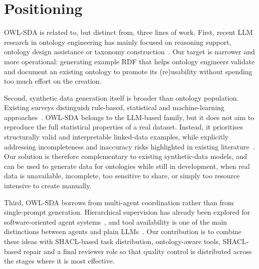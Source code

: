 \section{Positioning} \label{sec:related}
OWL-SDA is related to, but distinct from, three lines of work. First, recent LLM research in ontology engineering has mainly focused on reasoning support, ontology design assistance or taxonomy construction~\cite{damiano2025evaluating,yang2026large,soares2025exploring}. Our target is narrower and more operational: generating example RDF that helps ontology engineers validate and document an existing ontology to promote its (re)usability without spending too much effort on the creation.

Second, synthetic data generation itself is broader than ontology population. Existing surveys distinguish rule-based, statistical and machine-learning approaches~\cite{electronics13173509}. OWL-SDA belongs to the LLM-based family, but it does not aim to reproduce the full statistical properties of a real dataset. Instead, it prioritises structurally valid and interpretable linked-data examples, while explicitly addressing incompleteness and inaccuracy risks highlighted in existing literature~\cite{hao2024synthetic}. Our solution is therefore complementary to existing synthetic-data models, and can be used to generate data for ontologies while still in development, when real data is unavailable, incomplete, too sensitive to share, or simply too resource intensive to create manually. 

Third, OWL-SDA borrows from multi-agent coordination rather than from single-prompt generation. Hierarchical supervision has already been explored for software-oriented agent systems~\cite{banihashemi2018hierarchical,long2026ai}, and tool availability is one of the main distinctions between agents and plain LLMs~\cite{yehudai2025survey}. Our contribution is to combine these ideas with SHACL-based task distribution, ontology-aware tools, SHACL-based repair and a final reviewer role so that quality control is distributed across the stages where it is most effective.